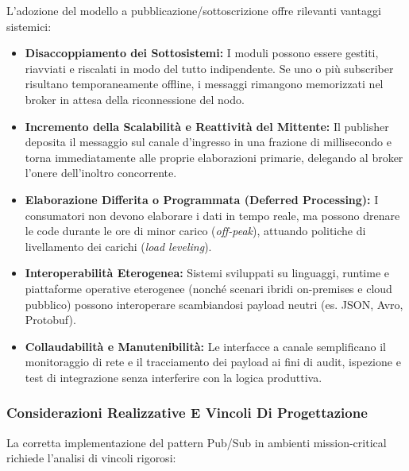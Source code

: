 \documentclass[11pt, a4paper]{article}
\begin{document}
L'adozione del modello a pubblicazione/sottoscrizione offre rilevanti vantaggi sistemici:
\begin{itemize}
    \item \textbf{Disaccoppiamento dei Sottosistemi:} I moduli possono essere gestiti, riavviati e riscalati in modo del tutto indipendente. Se uno o più subscriber risultano temporaneamente offline, i messaggi rimangono memorizzati nel broker in attesa della riconnessione del nodo.
    \item \textbf{Incremento della Scalabilità e Reattività del Mittente:} Il publisher deposita il messaggio sul canale d'ingresso in una frazione di millisecondo e torna immediatamente alle proprie elaborazioni primarie, delegando al broker l'onere dell'inoltro concorrente.
    \item \textbf{Elaborazione Differita o Programmata (Deferred Processing):} I consumatori non devono elaborare i dati in tempo reale, ma possono drenare le code durante le ore di minor carico (\emph{off-peak}), attuando politiche di livellamento dei carichi (\emph{load leveling}).
    \item \textbf{Interoperabilità Eterogenea:} Sistemi sviluppati su linguaggi, runtime e piattaforme operative eterogenee (nonché scenari ibridi on-premises e cloud pubblico) possono interoperare scambiandosi payload neutri (es. JSON, Avro, Protobuf).
    \item \textbf{Collaudabilità e Manutenibilità:} Le interfacce a canale semplificano il monitoraggio di rete e il tracciamento dei payload ai fini di audit, ispezione e test di integrazione senza interferire con la logica produttiva.
\end{itemize}

\subsubsection{Considerazioni Realizzative E Vincoli Di Progettazione}

La corretta implementazione del pattern Pub/Sub in ambienti mission-critical richiede l'analisi di vincoli rigorosi:
\end{document}
